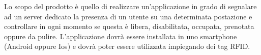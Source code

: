 Lo scopo del prodotto è quello di realizzare un’applicazione in grado di segnalare
 ad un server dedicato la presenza di un utente su una determinata postazione e 
 controllare in ogni momento se questa è libera, disabilitata, occupata, prenotata oppure da pulire. 
 L’applicazione dovrà essere installata in uno smartphone (Android oppure Ios) e dovrà poter essere 
 utilizzata impiegando dei tag RFID\glo{}.